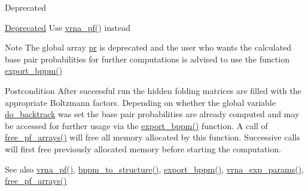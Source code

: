 \begin{DoxyRefDesc}{Deprecated}
\item[\hyperlink{deprecated__deprecated000101}{Deprecated}]Use \hyperlink{group__pf__fold_ga29e256d688ad221b78d37f427e0e99bc}{vrna\+\_\+pf()} instead\end{DoxyRefDesc}


\begin{DoxyNote}{Note}
The global array \hyperlink{fold__vars_8h_ac98ec419070aee6831b44e5c700f090f}{pr} is deprecated and the user who wants the calculated base pair probabilities for further computations is advised to use the function \hyperlink{group__pf__fold_gac5ac7ee281aae1c5cc5898a841178073}{export\+\_\+bppm()} 
\end{DoxyNote}
\begin{DoxyPostcond}{Postcondition}
After successful run the hidden folding matrices are filled with the appropriate Boltzmann factors. Depending on whether the global variable \hyperlink{group__model__details_gad512b5dd4dbec60faccfe137bb474489}{do\+\_\+backtrack} was set the base pair probabilities are already computed and may be accessed for further usage via the \hyperlink{group__pf__fold_gac5ac7ee281aae1c5cc5898a841178073}{export\+\_\+bppm()} function. A call of \hyperlink{group__pf__fold_gae73db3f49a94f0f72e067ecd12681dbd}{free\+\_\+pf\+\_\+arrays()} will free all memory allocated by this function. Successive calls will first free previously allocated memory before starting the computation. 
\end{DoxyPostcond}
\begin{DoxySeeAlso}{See also}
\hyperlink{group__pf__fold_ga29e256d688ad221b78d37f427e0e99bc}{vrna\+\_\+pf()}, \hyperlink{group__struct__utils_ga129d81c4a1ead793c5b2311333e03dfa}{bppm\+\_\+to\+\_\+structure()}, \hyperlink{group__pf__fold_gac5ac7ee281aae1c5cc5898a841178073}{export\+\_\+bppm()}, \hyperlink{group__energy__parameters_gab1f3016f96aa96bff020cdd904605afa}{vrna\+\_\+exp\+\_\+params()}, \hyperlink{group__pf__fold_gae73db3f49a94f0f72e067ecd12681dbd}{free\+\_\+pf\+\_\+arrays()} 
\end{DoxySeeAlso}

